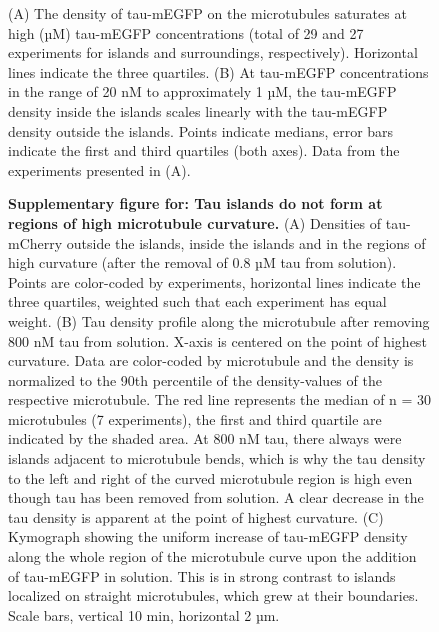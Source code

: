 \begin{figure}[h!tb]
\centering
\caption[Supplementary figure for: Tau islands are distinguished by tau cohesion.]{
(A) The density of tau-mEGFP on the microtubules saturates at high (µM) tau-mEGFP concentrations (total of 29 and 27 experiments for islands and surroundings, respectively). Horizontal lines indicate the three quartiles. (B) At tau-mEGFP concentrations in the range of 20 nM to approximately 1 µM, the tau-mEGFP density inside the islands scales linearly with the tau-mEGFP density outside the islands. Points indicate medians, error bars indicate the first and third quartiles (both axes). Data from the experiments presented in (A).
	}\label{tau_s5}
\end{figure}

\begin{figure}[h!tb]
\centering
\caption[Tau islands do not form at regions of high microtubule curvature.]{
\textbf{Supplementary figure for: Tau islands do not form at regions of high microtubule curvature.} 
(A) Densities of tau-mCherry outside the islands, inside the islands and in the regions of high curvature (after the removal of 0.8 µM tau from solution). Points are color-coded by experiments, horizontal lines indicate the three quartiles, weighted such that each experiment has equal weight. 
(B) Tau density profile along the microtubule after removing 800 nM tau from solution. X-axis is centered on the point of highest curvature. Data are color-coded by microtubule and the density is normalized to the 90th percentile of the density-values of the respective microtubule. The red line represents the median of n = 30 microtubules (7 experiments), the first and third quartile are indicated by the shaded area. At 800 nM tau, there always were islands adjacent to microtubule bends, which is why the tau density to the left and right of the curved microtubule region is high even though tau has been removed from solution. A clear decrease in the tau density is apparent at the point of highest curvature.
(C) Kymograph showing the uniform increase of tau-mEGFP density along the whole region of the microtubule curve upon the addition of tau-mEGFP in solution. This is in strong contrast to islands localized on straight microtubules, which grew at their boundaries. Scale bars, vertical 10 min, horizontal 2 µm.
	}\label{tau_s7}
\end{figure}

